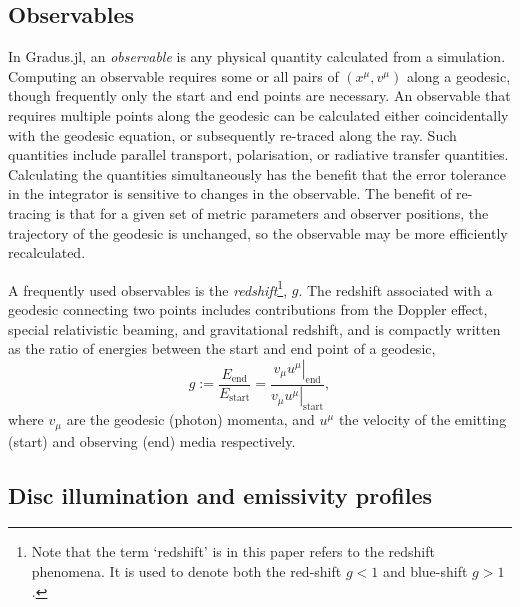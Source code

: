 \documentclass[fleqn,usenatbib]{mnras}
\newcommand{\software}[1]{{\sc #1}}
\newcommand{\Gradus}{\software{Gradus.jl}\xspace}
\begin{document}
\subsection{Observables}
\label{sec:computing-observables}

In \Gradus, an \textit{observable} is any physical quantity calculated from a
simulation. Computing an observable requires some or all pairs of $(x^\mu,
v^\mu)$ along a geodesic, though frequently only the start and end points are
necessary. An observable that requires multiple points along the geodesic can be
calculated either coincidentally with the geodesic equation, or subsequently
re-traced along the ray. Such quantities include parallel transport,
polarisation, or radiative transfer quantities. Calculating the quantities
simultaneously has the benefit that the error tolerance in the integrator is
sensitive to changes in the observable. The benefit of re-tracing is that for a
given set of metric parameters and observer positions, the trajectory of the
geodesic is unchanged, so the observable may be more efficiently recalculated.

A frequently used observables is the \emph{redshift}\footnote{Note that the term
`redshift' is in this paper refers to the redshift phenomena. It is used to
denote both the red-shift $g < 1$ and blue-shift $g > 1$.}, $g$. The redshift
associated with a geodesic connecting two points includes contributions from the
Doppler effect, special relativistic beaming, and gravitational redshift, and is
compactly written as the ratio of energies between the start and end point of a
geodesic,
\begin{equation}
\label{eq:redshift}
g := \frac{E_\text{end}}{E_\text{start}} = \frac{\left. v_\mu u^\mu
\right\rvert_\text{end}}{\left. v_\mu u^\mu \right\rvert_{\text{start}}},
\end{equation}
where $v_\mu$ are the geodesic (photon) momenta, and $u^\mu$ the velocity of the
emitting (start) and observing (end) media respectively.

\subsection{Disc illumination and emissivity profiles}
\label{sec:emissivity-profiles}
\end{document}
